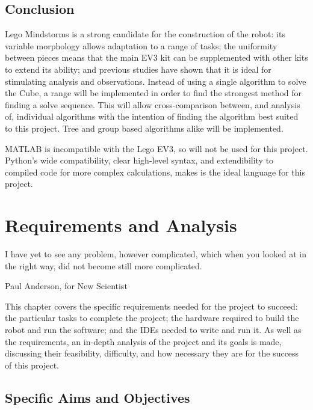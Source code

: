 \documentclass{report}
\begin{document}
    \section{Conclusion}
    Lego Mindstorms is a strong candidate for the construction of the robot: its variable morphology allows adaptation to a range of tasks; the uniformity between pieces means that the main EV3 kit can be supplemented with other kits to extend its ability; and previous studies have shown that it is ideal for stimulating analysis and observations. Instead of using a single algorithm to solve the Cube, a range will be implemented in order to find the strongest method for finding a solve sequence. This will allow cross-comparison between, and analysis of, individual algorithms with the intention of finding the algorithm best suited to this project. Tree and group based algorithms alike will be implemented.
    
    MATLAB is incompatible with the Lego EV3, so will not be used for this project. Python's wide compatibility, clear high-level syntax, and extendibility to compiled code for more complex calculations, makes is the ideal language for this project.
   
    \newpage
    \chapter{Requirements and Analysis}
    \epigraph{I have yet to see any problem, however complicated, which when you looked at in the right way, did not become still more complicated.}{Paul Anderson, for New Scientist \cite{Anderson1969}}
    
    This chapter covers the specific requirements needed for the project to succeed: the particular tasks to complete the project; the hardware required to build the robot and run the software; and the IDEs needed to write and run it. As well as the requirements, an in-depth analysis of the project and its goals is made, discussing their feasibility, difficulty, and how necessary they are for the success of this project.
    
    \section{Specific Aims and Objectives} \label{sec:objectives}
    
\end{document}
